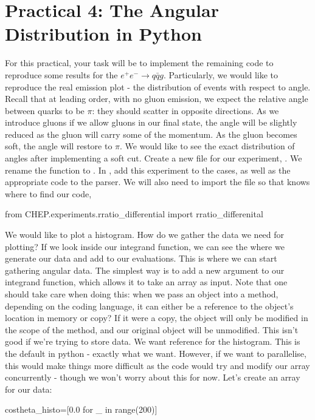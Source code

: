 \section*{Practical 4: The Angular Distribution in Python }

For this practical, your task will be to implement the remaining code to reproduce some results for the $e^+e^-\to q\bar{q}g$. Particularly, we would like to reproduce the real emission plot - the distribution of events with respect to angle. Recall that at leading order, with no gluon emission, we expect the relative angle between quarks to be $\pi$: they should scatter in opposite directions. As we introduce gluons if we allow gluons in our final state, the angle will be slightly reduced as the gluon will carry some of the momentum. As the gluon becomes soft, the angle will restore to $\pi$. We would like to see the exact distribution of angles after implementing a soft cut. 
Create a new file for our experiment, . We rename the function to . In , add this experiment to the cases, as well as the appropriate code to the parser. We will also need to import the file so that  knows where to find our code,
\begin{codeenv}
    from CHEP.experiments.rratio_differential import rratio_differenital
\end{codeenv}
We would like to plot a histogram. How do we gather the data we need for plotting? If we look inside our integrand function, we can see the where we generate our data and add to our evaluations. This is where we can start gathering angular data. The simplest way is to add a new argument to our integrand function, which allows it to take an array as input. Note that one should take care when doing this: when we pass an object into a method, depending on the coding language, it can either be a reference to the object's location in memory or copy? If it were a copy, the object will only be modified in the scope of the method, and our original object will be unmodified. This isn't good if we're trying to store data. We want reference for the histogram. This is the default in python - exactly what we want. However, if we want to parallelise, this would make things more difficult as the code would try and modify our array concurrently - though we won't worry about this for now. Let's create an array for our data:
\begin{codeenv}
       costheta_histo=[0.0 for _ in range(200)]
\end{codeenv}
